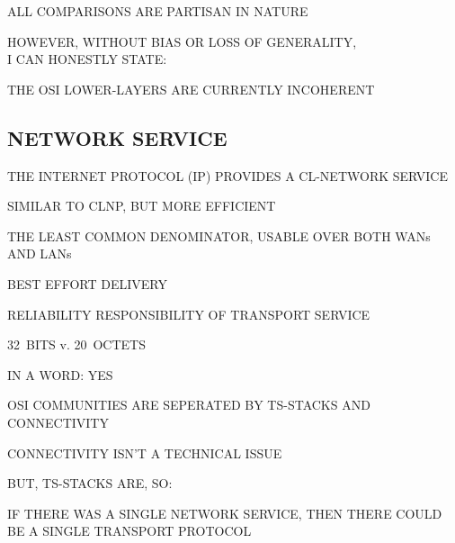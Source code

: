 \begin{bwslide}

\begin{nrtc}
\item	ALL COMPARISONS ARE PARTISAN IN NATURE

\item	HOWEVER, WITHOUT BIAS OR LOSS OF GENERALITY,\\ I CAN HONESTLY STATE:
    \begin{nrtc}
    \item	THE OSI LOWER-LAYERS ARE CURRENTLY INCOHERENT
    \end{nrtc}
\end{nrtc}
\end{bwslide}


\begin{bwslide}
\part*	{NETWORK SERVICE}\bf

\begin{nrtc}
\item	THE INTERNET PROTOCOL (IP) PROVIDES A CL-NETWORK SERVICE
    \begin{nrtc}
    \item	SIMILAR TO CLNP, BUT MORE EFFICIENT
    \end{nrtc}

\item	THE LEAST COMMON DENOMINATOR, USABLE OVER BOTH WANs AND LANs
    \begin{nrtc}
    \item	BEST EFFORT DELIVERY

    \item	RELIABILITY RESPONSIBILITY OF TRANSPORT SERVICE
    \end{nrtc}

\item	32~BITS v. 20~OCTETS
\end{nrtc}
\end{bwslide}


\begin{bwslide}

\begin{nrtc}
\item	IN A WORD: YES

\item	OSI COMMUNITIES ARE SEPERATED BY TS-STACKS AND CONNECTIVITY

\item	CONNECTIVITY ISN'T A TECHNICAL ISSUE

\item	BUT, TS-STACKS ARE, SO:
    \begin{nrtc}
    \item	IF THERE WAS A SINGLE NETWORK SERVICE,
		THEN THERE COULD BE A SINGLE TRANSPORT PROTOCOL
    \end{nrtc}
\end{nrtc}
\end{bwslide}


